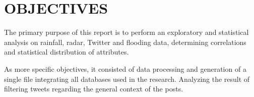 \chapter{OBJECTIVES}\label{Obj}


The primary purpose of this report is to perform an exploratory and statistical analysis on rainfall, radar, Twitter and flooding data, determining correlations and statistical distribution of attributes.

As more specific objectives, it consisted of data processing and generation of a single file integrating all databases used in the research. Analyzing the result of filtering tweets regarding the general context of the posts.




